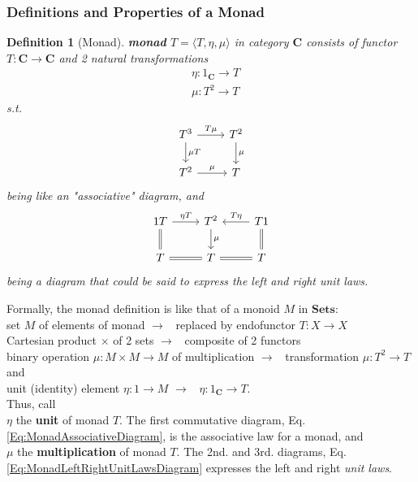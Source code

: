 \documentclass[10pt]{amsart}
\newtheorem{definition}{Definition}
\begin{document}
\begin{multicols*}{2}
\subsubsection{Definitions and Properties of a Monad}

\begin{definition}[Monad]\label{Def:Monad}
\textbf{monad} $T = \langle T, \eta, \mu \rangle$ in category $\mathbf{C}$ consists of functor $T: \mathbf{C} \to \mathbf{C}$ and 2 natural transformations
\begin{equation}
\begin{aligned}
& \eta : 1_{\mathbf{C}} \to T \\ 
& \mu : T^2 \to T
\end{aligned}
\end{equation}	
s.t. 
\begin{equation}\label{Eq:MonadAssociativeDiagram}
\begin{tikzcd}
T^3 \arrow{d}{\mu T} \arrow{r}{T\mu} & T^2 \arrow{d}{\mu} \\
T^2 \arrow{r}{\mu} & T
\end{tikzcd}
\end{equation}
being like an "associative" diagram, and 
\begin{equation}\label{Eq:MonadLeftRightUnitLawsDiagram}
\begin{tikzcd}
	1T \arrow[equal]{d} \arrow{r}{\eta T} & T^2 \arrow{d}{\mu} & T1 \arrow{l}[swap]{T \eta} \arrow[equal]{d} \\
	T \arrow[equal]{r} & T & T \arrow[equal]{l}
\end{tikzcd}
\end{equation}
being a diagram that could be said to express the left and right unit laws.
\end{definition} 

Formally, the monad definition is like that of a monoid $M$ in $\mathbf{Sets}$: \\
set $M$ of elements of monad \quad $\to $ \, replaced by endofunctor $T : X \to X$ \\
Cartesian product $\times$ of 2 sets \quad $\to $ \, composite of 2 functors \\
binary operation $\mu : M \times M \to M$ of multiplication \quad $\to $ \, transformation $\mu : T^2 \to T$ and \\
unit (identity) element $\eta:1 \to M$ \quad $\to $ \, $\eta : 1_{\mathbf{C}} \to T$. \\

Thus, call \\
$\eta$ the \textbf{unit} of monad $T$. The first commutative diagram, Eq. \ref{Eq:MonadAssociativeDiagram}, is the associative law for a monad, and \\
$\mu$ the \textbf{multiplication} of monad $T$. The 2nd. and 3rd. diagrams, Eq. \ref{Eq:MonadLeftRightUnitLawsDiagram} expresses the left and right \emph{unit laws}.


\end{multicols*}
\end{document}
